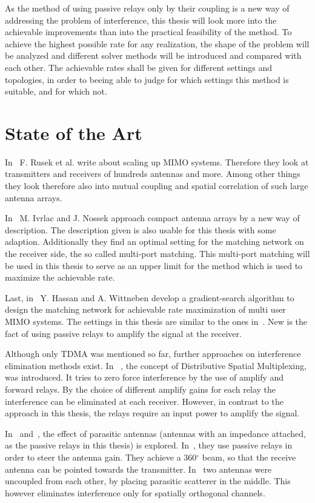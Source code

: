 As the method of using passive relays only by their coupling is a new way of addressing the problem of interference, this thesis will look more into the achievable improvements than into the practical feasibility of the method.
To achieve the highest possible rate for any realization, the shape of the problem will be analyzed and different solver methods will be introduced and compared with each other.
The achievable rates shall be given for different settings and topologies, in order to beeing able to judge for which settings this method is suitable, and for which not.

\section{State of the Art}
\label{sec:SoA}

In~\cite{rusek13} F. Rusek et al. write about scaling up MIMO systems.
Therefore they look at transmitters and receivers of hundreds antennas and more.
Among other things they look therefore also into mutual coupling and spatial correlation of such large antenna arrays.

In~\cite{Nossek} M. Ivrlac and J. Nossek approach compact antenna arrays by a new way of description.
The description given is also usable for this thesis with some adaption.
Additionally they find an optimal setting for the matching network on the receiver side, the so called multi-port matching.
This multi-port matching will be used in this thesis to serve as an upper limit for the method which is used to maximize the achievable rate.

Last, in~\cite{Yahia2013} Y. Hassan and A. Wittneben develop a gradient-search algorithm to design the matching network for achievable rate maximization of multi user MIMO systems.
The settings in this thesis are similar to the ones in~\cite{Yahia2013}.
New is the fact of using passive relays to amplify the signal at the receiver.

Although only TDMA was mentioned so far, further approaches on interference elimination methods exist.
In ~\cite{Berger05}, the concept of Distributive Spatial Multiplexing, was introduced.
It tries to zero force interference by the use of amplify and forward relays.
By the choice of different amplify gains for each relay the interference can be eliminated at each receiver.
However, in contrast to the approach in this thesis, the relays require an input power to amplify the signal.

In~\cite{Bains08} and~\cite{Lau12}, the effect of parasitic antennas (antennas with an impedance attached, as the passive relays in this thesis) is explored.
In~\cite{Bains08}, they use passive relays in order to steer the antenna gain.
They achieve a 360$^\circ$ beam, so that the receive antenna can be pointed towards the transmitter.
In~\cite{Lau12} two antennas were uncoupled from each other, by placing parasitic scatterer in the middle.
This however eliminates interference only for spatially orthogonal channels.


